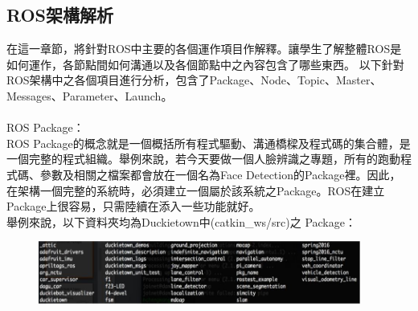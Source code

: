 \documentclass{article}
\begin{document}
\subsection{ROS架構解析}
在這一章節，將針對ROS中主要的各個運作項目作解釋。讓學生了解整體ROS是如何運作，各節點間如何溝通以及各個節點中之內容包含了哪些東西。
以下針對ROS架構中之各個項目進行分析，包含了Package、Node、Topic、Master、Messages、Parameter、Launch。
\\
\\ROS Package：
\\ROS Package的概念就是一個概括所有程式驅動、溝通橋樑及程式碼的集合體，是一個完整的程式組織。舉例來說，若今天要做一個人臉辨識之專題，所有的跑動程式碼、參數及相關之檔案都會放在一個名為Face Detection的Package裡。因此，在架構一個完整的系統時，必須建立一個屬於該系統之Package。ROS在建立Package上很容易，只需陸續在添入一些功能就好。
\\舉例來說，以下資料夾均為Duckietown中(catkin\_ws/src)之 Package：
\\
\begin{figure}[htp]
    \begin{center}
        \includegraphics[width=300pt]{pic/圖片17.jpg}
    \end{center}
\end{figure}
\end{document}
